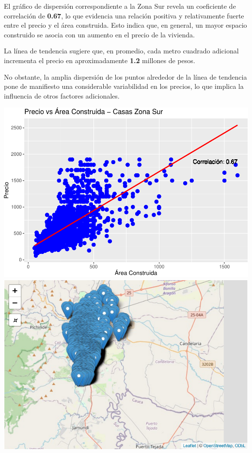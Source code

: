 \documentclass[
]{article}
\begin{document}
El gráfico de dispersión correspondiente a la Zona Sur revela un
coeficiente de correlación de \textbf{0.67}, lo que evidencia una
relación positiva y relativamente fuerte entre el precio y el área
construida. Esto indica que, en general, un mayor espacio construido se
asocia con un aumento en el precio de la vivienda.

La línea de tendencia sugiere que, en promedio, cada metro cuadrado
adicional incrementa el precio en aproximadamente \textbf{1.2} millones
de pesos.

No obstante, la amplia dispersión de los puntos alrededor de la línea de
tendencia pone de manifiesto una considerable variabilidad en los
precios, lo que implica la influencia de otros factores adicionales.

\includegraphics{A2_U2_InformeEjecutivo_files/figure-latex/unnamed-chunk-5-1.pdf}
\includegraphics{A2_U2_InformeEjecutivo_files/figure-latex/unnamed-chunk-5-2.pdf}
\end{document}
